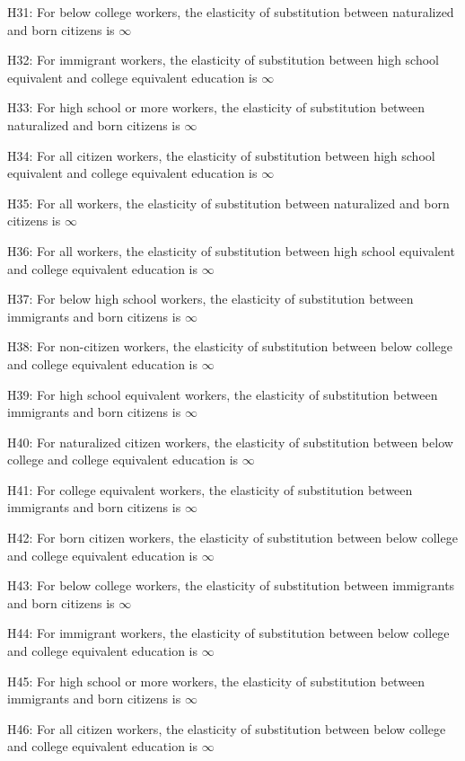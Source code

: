 \documentclass[11pt]{article}
\theoremstyle{definition}
\theoremstyle{remark}
\begin{document}
{H31: For below college workers, the elasticity of substitution between naturalized and born citizens is $\infty$

H32: For immigrant workers, the elasticity of substitution between high school equivalent and college equivalent education is $\infty$

H33: For high school or more workers, the elasticity of substitution between naturalized and born citizens is $\infty$

H34: For all citizen workers, the elasticity of substitution between high school equivalent and college equivalent education is $\infty$

H35: For all workers, the elasticity of substitution between naturalized and born citizens is $\infty$

H36: For all workers, the elasticity of substitution between high school equivalent and college equivalent education is $\infty$

H37: For below high school workers, the elasticity of substitution between immigrants and born citizens is $\infty$

H38: For non-citizen workers, the elasticity of substitution between below college and college equivalent education is $\infty$

H39: For high school equivalent workers, the elasticity of substitution between immigrants and born citizens is $\infty$

H40: For naturalized citizen workers, the elasticity of substitution between below college and college equivalent education is $\infty$

H41: For college equivalent workers, the elasticity of substitution between immigrants and born citizens is $\infty$

H42: For born citizen workers, the elasticity of substitution between below college and college equivalent education is $\infty$

H43: For below college workers, the elasticity of substitution between immigrants and born citizens is $\infty$

H44: For immigrant workers, the elasticity of substitution between below college and college equivalent education is $\infty$

H45: For high school or more workers, the elasticity of substitution between immigrants and born citizens is $\infty$

H46: For all citizen workers, the elasticity of substitution between below college and college equivalent education is $\infty$

}
\end{document}
